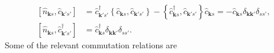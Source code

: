 \documentclass[english, parskip=full]{scrartcl}
\newcommand{\kla}{}
\newcommand{\klam}{}
\newcommand{\klammer}{}
\begin{document}
\begin{align}
\klam\left[ \hat{n}_{\textbf{k}s}, \hat{c}_{\textbf{k}'s'} \right] &= \hat{c}_{\textbf{k}'s'}^\dagger \klammer\left\{ \hat{c}_{\textbf{k}s}, \hat{c}_{\textbf{k}'s'} \right\} - \klammer\left\{ \hat{c}_{\textbf{k}s}^\dagger, \hat{c}_{\textbf{k}'s'} \right\} \hat{c}_{\textbf{k}s} = -\hat{c}_{\textbf{k}s} \delta_{\textbf{kk}'} \delta_{ss'},\\
\left[ \hat{n}_{\textbf{k}s}, \hat{c}_{\textbf{k}'s'}^\dagger \right] &= \hat{c}_{\textbf{k}s}^\dagger \delta_{\textbf{kk}'} \delta_{ss'}.
\end{align}
Some of the relevant commutation relations are
\end{document}
